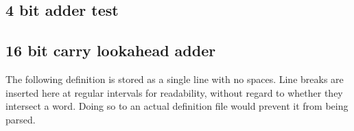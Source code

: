 \documentclass[a4paper]{article}
\begin{document}
    \subsection{4 bit adder test}
        

\clearpage

    \subsection{16 bit carry lookahead adder}
        The following definition is stored as a single line with no spaces. Line breaks are inserted here at regular intervals for readability, without regard to whether they intersect a word. Doing so to an actual definition file would prevent it from being parsed.
        

\null
\vfill


\end{document}
